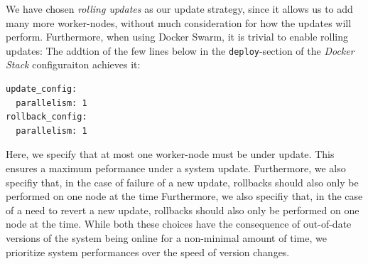 We have chosen \textit{rolling updates} as our update strategy, since it allows us to add many more worker-nodes, without much consideration for how the updates will perform.
Furthermore, when using Docker Swarm, it is trivial to enable rolling updates: The addtion of the few lines below in the \texttt{deploy}-section of the \textit{Docker Stack} configuraiton achieves it:

\begin{lstlisting}
update_config:
  parallelism: 1
rollback_config:
  parallelism: 1
\end{lstlisting}

Here, we specify that at most one worker-node must be under update. This ensures a maximum peformance under a system update.
Furthermore, we also specifiy that, in the case of failure of a new update, rollbacks should also only be performed on one node at the time
Furthermore, we also specifiy that, in the case of a need to revert a new update, rollbacks should also only be performed on one node at the time.
While both these choices have the consequence of out-of-date versions of the system being online for a non-minimal amount of time, we prioritize system performances over the speed of version changes.


